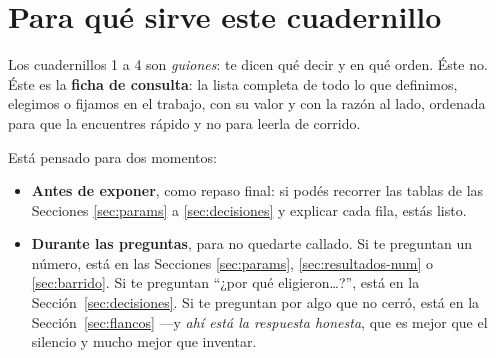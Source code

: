 \documentclass[11pt]{article}
\begin{document}

\tableofcontents
\clearpage

\section{Para qué sirve este cuadernillo}

Los cuadernillos 1 a 4 son \emph{guiones}: te dicen qué decir y en qué orden.
Éste no. Éste es la \textbf{ficha de consulta}: la lista completa de todo lo que
definimos, elegimos o fijamos en el trabajo, con su valor y con la razón al
lado, ordenada para que la encuentres rápido y no para leerla de corrido.

Está pensado para dos momentos:

\begin{itemize}
  \item \textbf{Antes de exponer}, como repaso final: si podés recorrer las
    tablas de las Secciones \ref{sec:params} a \ref{sec:decisiones} y explicar
    cada fila, estás listo.
  \item \textbf{Durante las preguntas}, para no quedarte callado. Si te
    preguntan un número, está en las Secciones \ref{sec:params},
    \ref{sec:resultados-num} o \ref{sec:barrido}. Si te preguntan
    ``¿por qué eligieron\ldots?'', está en la Sección~\ref{sec:decisiones}. Si
    te preguntan por algo que no cerró, está en la Sección~\ref{sec:flancos}
    ---y \emph{ahí está la respuesta honesta}, que es mejor que el silencio y
    mucho mejor que inventar.
\end{itemize}


\end{document}
